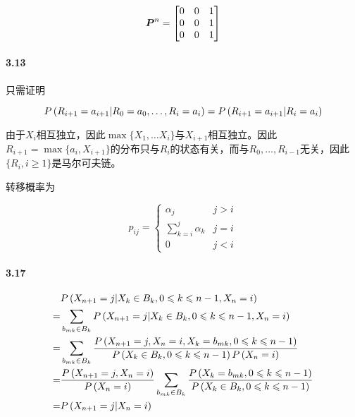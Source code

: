\documentclass{article}
\begin{document}
    \begin{equation}
        \boldsymbol P^n = \begin{bmatrix}
            0 & 0 & 1 \\
            0 & 0 & 1 \\
            0 & 0 & 1
        \end{bmatrix}
    \end{equation}

    \paragraph*{3.13} 只需证明

    \begin{equation}
        P\left(R_{i+1} = a_{i+1}|R_0=a_0,\dots,R_i=a_i\right) = P\left(R_{i+1} = a_{i+1}|R_i=a_i\right)
    \end{equation}

    由于$X_i$相互独立，因此$\max\{X_1, \dots X_i\}$与$X_{i+1}$相互独立。因此$R_{i+1} = \max\{a_i, X_{i+1}\}$的分布只与$R_i$的状态有关，而与$R_{0},\dots,R_{i-1}$无关，因此$\{R_i, i\geq 1\}$是马尔可夫链。

    转移概率为

    \begin{equation}
        p_{ij} = \begin{cases}
            \alpha_{j} & j > i \\
            \sum_{k=i}^j \alpha_{k} & j = i \\
            0 & j < i
        \end{cases}
    \end{equation}

    \paragraph*{3.17}

    \begin{equation}
        \begin{aligned}
            &P\left(X_{n+1}=j|X_k\in B_k, 0\leqslant k\leqslant n-1, X_n=i\right) \\
            =&\sum_{b_{mk}\in B_k} P\left(X_{n+1}=j|X_k\in B_{k}, 0\leqslant k\leqslant n-1, X_n = i\right) \\
            =&\sum_{b_{mk}\in B_k} \frac{P\left(X_{n+1}=j, X_n=i, X_k=b_{mk}, 0\leqslant k\leqslant n-1\right)}{P\left(X_k\in B_{k}, 0\leqslant k\leqslant n-1\right)P\left(X_n=i\right)} \\
            =&\frac{P\left(X_{n+1}=j, X_n=i\right)}{P\left(X_n=i\right)} \sum_{b_{mk}\in B_k} \frac{P\left(X_k=b_{mk}, 0\leqslant k\leqslant n-1\right)}{P\left(X_k\in B_{k}, 0\leqslant k\leqslant n-1\right)} \\
            =&P\left(X_{n+1}=j|X_n=i\right)
        \end{aligned}
    \end{equation}
\end{document}
